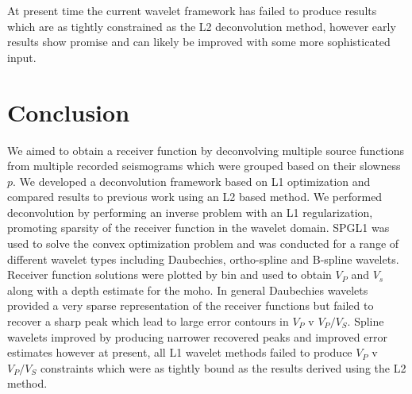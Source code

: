 \documentclass[jgrga]{agutex}
\begin{document}
\begin{article}
At present time the current wavelet framework has failed to produce results which are as tightly constrained as the L2 deconvolution method, however early results show promise and can likely be improved with some more sophisticated input. 

\section{Conclusion}

We aimed to obtain a receiver function by deconvolving multiple source functions from multiple recorded seismograms which were grouped based on their slowness $p$. We developed a deconvolution framework based on L1 optimization and compared results to previous work using an L2 based method. We performed deconvolution by performing an inverse problem with an L1 regularization, promoting sparsity of the receiver function in the wavelet domain. SPGL1 was used to solve the convex optimization problem and was conducted for a range of different wavelet types including Daubechies, ortho-spline and B-spline wavelets. Receiver function solutions were plotted by bin and used to obtain $V_{P}$ and $V_{s}$ along with a depth estimate for the moho. In general Daubechies wavelets provided a very sparse representation of the receiver functions but failed to recover a sharp peak which lead to large error contours in $V_{P}$ v $V_{P}/V_{S}$. Spline wavelets improved by producing narrower recovered peaks and improved error estimates however at present, all L1 wavelet methods failed to produce $V_{P}$ v $V_{P}/V_{S}$ constraints which were as tightly bound as the results derived using the L2 method. 


\end{article}
\end{document}
